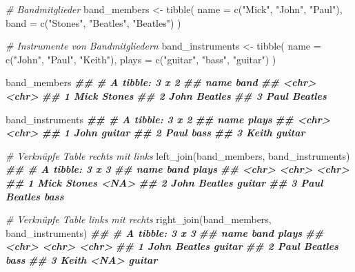 \documentclass[
]{article}
\newenvironment{Shaded}{\begin{snugshade}}{\end{snugshade}}
\newcommand{\AttributeTok}[1]{\textcolor[rgb]{0.77,0.63,0.00}{#1}}
\newcommand{\CommentTok}[1]{\textcolor[rgb]{0.56,0.35,0.01}{\textit{#1}}}
\newcommand{\DocumentationTok}[1]{\textcolor[rgb]{0.56,0.35,0.01}{\textbf{\textit{#1}}}}
\newcommand{\FunctionTok}[1]{\textcolor[rgb]{0.00,0.00,0.00}{#1}}
\newcommand{\NormalTok}[1]{#1}
\newcommand{\OtherTok}[1]{\textcolor[rgb]{0.56,0.35,0.01}{#1}}
\newcommand{\StringTok}[1]{\textcolor[rgb]{0.31,0.60,0.02}{#1}}
\begin{document}
\begin{Shaded}
\begin{Highlighting}[]
\CommentTok{\# Bandmitglieder}
\NormalTok{band\_members }\OtherTok{\textless{}{-}} \FunctionTok{tibble}\NormalTok{(}
  \AttributeTok{name =} \FunctionTok{c}\NormalTok{(}\StringTok{"Mick"}\NormalTok{, }\StringTok{"John"}\NormalTok{, }\StringTok{"Paul"}\NormalTok{), }
  \AttributeTok{band =} \FunctionTok{c}\NormalTok{(}\StringTok{"Stones"}\NormalTok{, }\StringTok{"Beatles"}\NormalTok{, }\StringTok{"Beatles"}\NormalTok{)}
\NormalTok{)}

\CommentTok{\# Instrumente von Bandmitgliedern}
\NormalTok{band\_instruments }\OtherTok{\textless{}{-}} \FunctionTok{tibble}\NormalTok{(}
  \AttributeTok{name =} \FunctionTok{c}\NormalTok{(}\StringTok{"John"}\NormalTok{, }\StringTok{"Paul"}\NormalTok{, }\StringTok{"Keith"}\NormalTok{), }
  \AttributeTok{plays =} \FunctionTok{c}\NormalTok{(}\StringTok{"guitar"}\NormalTok{, }\StringTok{"bass"}\NormalTok{, }\StringTok{"guitar"}\NormalTok{)}
\NormalTok{)}

\NormalTok{band\_members}
\DocumentationTok{\#\# \# A tibble: 3 x 2}
\DocumentationTok{\#\#   name  band   }
\DocumentationTok{\#\#   \textless{}chr\textgreater{} \textless{}chr\textgreater{}  }
\DocumentationTok{\#\# 1 Mick  Stones }
\DocumentationTok{\#\# 2 John  Beatles}
\DocumentationTok{\#\# 3 Paul  Beatles}

\NormalTok{band\_instruments}
\DocumentationTok{\#\# \# A tibble: 3 x 2}
\DocumentationTok{\#\#   name  plays }
\DocumentationTok{\#\#   \textless{}chr\textgreater{} \textless{}chr\textgreater{} }
\DocumentationTok{\#\# 1 John  guitar}
\DocumentationTok{\#\# 2 Paul  bass  }
\DocumentationTok{\#\# 3 Keith guitar}

\CommentTok{\# Verknüpfe Table rechts mit links}
\FunctionTok{left\_join}\NormalTok{(band\_members, band\_instruments)}
\DocumentationTok{\#\# \# A tibble: 3 x 3}
\DocumentationTok{\#\#   name  band    plays }
\DocumentationTok{\#\#   \textless{}chr\textgreater{} \textless{}chr\textgreater{}   \textless{}chr\textgreater{} }
\DocumentationTok{\#\# 1 Mick  Stones  \textless{}NA\textgreater{}  }
\DocumentationTok{\#\# 2 John  Beatles guitar}
\DocumentationTok{\#\# 3 Paul  Beatles bass}

\CommentTok{\# Verknüpfe Table links mit rechts}
\FunctionTok{right\_join}\NormalTok{(band\_members, band\_instruments)}
\DocumentationTok{\#\# \# A tibble: 3 x 3}
\DocumentationTok{\#\#   name  band    plays }
\DocumentationTok{\#\#   \textless{}chr\textgreater{} \textless{}chr\textgreater{}   \textless{}chr\textgreater{} }
\DocumentationTok{\#\# 1 John  Beatles guitar}
\DocumentationTok{\#\# 2 Paul  Beatles bass  }
\DocumentationTok{\#\# 3 Keith \textless{}NA\textgreater{}    guitar}


\end{Highlighting}
\end{Shaded}
\end{document}
